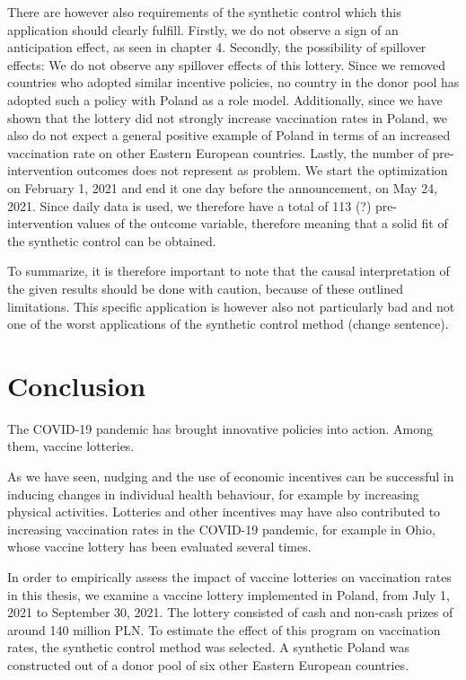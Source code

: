 \documentclass{scrbook}
\begin{document}
There are however also requirements of the synthetic control which this
application should clearly fulfill. Firstly, we do not observe a sign of
an anticipation effect, as seen in chapter 4. Secondly, the possibility
of spillover effects: We do not observe any spillover effects of this
lottery. Since we removed countries who adopted similar incentive
policies, no country in the donor pool has adopted such a policy with
Poland as a role model. Additionally, since we have shown that the
lottery did not strongly increase vaccination rates in Poland, we also
do not expect a general positive example of Poland in terms of an
increased vaccination rate on other Eastern European countries. Lastly,
the number of pre-intervention outcomes does not represent as problem.
We start the optimization on February 1, 2021 and end it one day before
the announcement, on May 24, 2021. Since daily data is used, we
therefore have a total of 113 (?) pre-intervention values of the outcome
variable, therefore meaning that a solid fit of the synthetic control
can be obtained.

To summarize, it is therefore important to note that the causal
interpretation of the given results should be done with caution, because
of these outlined limitations. This specific application is however also
not particularly bad and not one of the worst applications of the
synthetic control method (change sentence).

\chapter{Conclusion}

The COVID-19 pandemic has brought innovative policies into action. Among
them, vaccine lotteries.

As we have seen, nudging and the use of economic incentives can be
successful in inducing changes in individual health behaviour, for
example by increasing physical activities. Lotteries and other
incentives may have also contributed to increasing vaccination rates in
the COVID-19 pandemic, for example in Ohio, whose vaccine lottery has
been evaluated several times.

In order to empirically assess the impact of vaccine lotteries on
vaccination rates in this thesis, we examine a vaccine lottery
implemented in Poland, from July 1, 2021 to September 30, 2021. The
lottery consisted of cash and non-cash prizes of around 140 million PLN.
To estimate the effect of this program on vaccination rates, the
synthetic control method was selected. A synthetic Poland was
constructed out of a donor pool of six other Eastern European countries.
\end{document}
